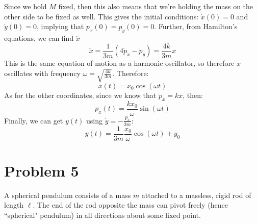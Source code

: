 \documentclass[10pt]{article}
\begin{document}
\begin{enumerate}[label=\alph*)]
\begin{solution}
				Since we hold $M$ fixed, then this also means that we're holding the mass on the other side
				to be fixed as well. This gives the initial conditions: $\dot x(0) = 0$ and $\dot y(0) = 0$, 
				implying that $p_x(0) = p_y(0) = 0$. Further, from Hamilton's equations, we can find $\ddot x$
				\[
				\ddot x = \frac{1}{3m}(4 \ddot p_x - \ddot p_y) = \frac{4k}{3m}x
				\] 
				This is the same equation of motion as a harmonic oscillator, so therefore $x$ oscillates with 
				frequency $\omega = \sqrt{\frac{4k}{3m}}$. Therefore: 
				\[
				x(t) = x_0\cos(\omega t)
				\] 
				As for the other coordinates, since we know that $\dot p_x = kx$, then: 
				\[
				p_x(t) = \frac{kx_0}{\omega}\sin(\omega t)
				\] 
				Finally, we can get $y(t)$ using $\dot y = -\frac{p_x}{3m}$:
				\[
				y(t) = \frac{1}{3m}\frac{x_0}{\omega}\cos(\omega t) + y_0
				\] 

			\end{solution}
	\end{enumerate}


	\pagebreak

	\section*{Problem 5}
	A spherical pendulum consists of a mass $m$ attached to a massless, rigid rod of length $\ell$. The end 
	of the rod opposite the mass can pivot freely (hence ``spherical" pendulum) in all directions about
	some fixed point. 
\end{document}
